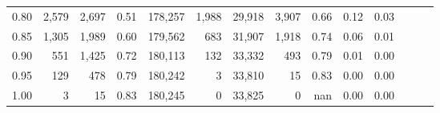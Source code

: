 \begin{tabular}{rrrrrrrrrrrrrr}
0.80 &   2,579 &  2,697 &  0.51 &  178,257 &    1,988 &  29,918 &   3,907 &  0.66 &  0.12 &      0.03 \\
0.85 &   1,305 &  1,989 &  0.60 &  179,562 &      683 &  31,907 &   1,918 &  0.74 &  0.06 &      0.01 \\
0.90 &     551 &  1,425 &  0.72 &  180,113 &      132 &  33,332 &     493 &  0.79 &  0.01 &      0.00 \\
0.95 &     129 &    478 &  0.79 &  180,242 &        3 &  33,810 &      15 &  0.83 &  0.00 &      0.00 \\
1.00 &       3 &     15 &  0.83 &  180,245 &        0 &  33,825 &       0 &   nan &  0.00 &      0.00 \\
\bottomrule
\end{tabular}
